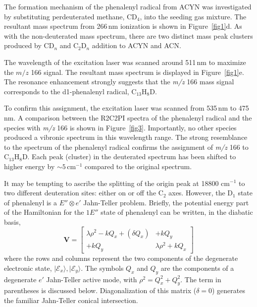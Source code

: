 \documentclass[journal=jacsat,manuscript=article,layout=onecolumn]{achemso}
\begin{document}
The formation mechanism of the phenalenyl radical from ACYN was investigated by substituting perdeuterated methane, CD$_4$, into the seeding gas mixture. The resultant mass spectrum from 266\,nm ionization is shown in Figure~\ref{fig1}d. As with the non-deuterated mass spectrum, there are two distinct mass peak clusters produced by CD$_n$ and C$_2$D$_n$ addition to ACYN and ACN.

The wavelength of the excitation laser was scanned around 511\,nm to maximize the $m/z$ 166 signal. The resultant mass spectrum is displayed in Figure~\ref{fig1}e. The resonance enhancement strongly suggests that the \textit{m/z} 166 mass signal corresponds to the d1-phenalenyl radical, C$_{13}$H$_8$D.

To confirm this assignment, the excitation laser was scanned from 535\,nm to 475\,nm. A comparison between the R2C2PI spectra of the phenalenyl radical and the species with \textit{m/z} 166 is shown in Figure~\ref{fig3}. Importantly, no other species produced a vibronic spectrum in this wavelength range. The strong resemblance to the spectrum of the phenalenyl radical confirms the assignment of \textit{m/z} 166 to C$_{13}$H$_8$D. Each peak (cluster) in the deuterated spectrum has been shifted to higher energy by $\sim5$\,cm$^{-1}$ compared to the original spectrum.

It may be tempting to ascribe the splitting of the origin peak at 18800 cm$^{-1}$ to two different deuteration sites: either on or off the C$_2$ axes. However, the D$_1$ state of phenalenyl is a $E''\otimes e'$ Jahn-Teller problem. Briefly, the potential energy part of the Hamiltonian for the $1E''$ state of phenalenyl can be written, in the diabatic basis,
\begin{equation}\label{JT}
  \mathbf{V} = \left[\begin{array}{cc}
                       \lambda\rho^2 - kQ_x + (\delta Q_x) & +kQ_y \\
                       +kQ_y &  \lambda\rho^2 + kQ_x
                     \end{array}
    \right]
\end{equation}
where the rows and columns represent the two components of the degenerate electronic state, $|\mathcal{E}_x\rangle,|\mathcal{E}_y\rangle$. The symbols $Q_x$ and $Q_y$ are the components of a degenerate $e'$ Jahn-Teller active mode, with $\rho^2=Q_x^2+Q_y^2$. The term in parentheses is discussed below. Diagonalization of this matrix ($\delta=0$) generates the familiar Jahn-Teller conical intersection.
\end{document}
